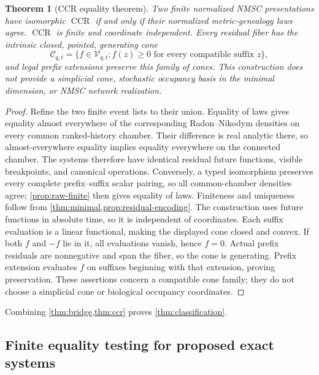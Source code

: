 \documentclass[11pt]{article}
\newtheorem{theorem}{Theorem}[section]
\newcommand{\CCR}{\operatorname{CCR}}
\newcommand{\cV}{\mathcal V}
\newcommand{\cC}{\mathcal C}
\begin{document}
\begin{theorem}[CCR equality theorem]
\label{thm:ccr}
Two finite normalized NMSC presentations have isomorphic $\CCR$ if and only if their normalized metric-genealogy laws agree.  $\CCR$ is finite and coordinate independent.  Every residual fiber has the intrinsic closed, pointed, generating cone
\[
\cC_{q,t}=\{f\in\cV_{q,t}: f(z)\ge0\text{ for every compatible suffix }z\},
\]
and legal prefix extensions preserve this family of cones.  This construction does not provide a simplicial cone, stochastic occupancy basis in the minimal dimension, or NMSC network realization.
\end{theorem}

\begin{proof}
Refine the two finite event lists to their union.  Equality of laws gives equality almost everywhere of the corresponding Radon--Nikodym densities on every common ranked-history chamber.  Their difference is real analytic there, so almost-everywhere equality implies equality everywhere on the connected chamber.  The systems therefore have identical residual future functions, visible breakpoints, and canonical operations.  Conversely, a typed isomorphism preserves every complete prefix--suffix scalar pairing, so all common-chamber densities agree; \cref{prop:raw-finite} then gives equality of laws.  Finiteness and uniqueness follow from \cref{thm:minimal,prop:residual-encoding}.  The construction uses future functions in absolute time, so it is independent of coordinates.  Each suffix evaluation is a linear functional, making the displayed cone closed and convex.  If both $f$ and $-f$ lie in it, all evaluations vanish, hence $f=0$.  Actual prefix residuals are nonnegative and span the fiber, so the cone is generating.  Prefix extension evaluates $f$ on suffixes beginning with that extension, proving preservation.  These assertions concern a compatible cone family; they do not choose a simplicial cone or biological occupancy coordinates.
\end{proof}

Combining \cref{thm:bridge,thm:ccr} proves \cref{thm:classification}.

\subsection{Finite equality testing for proposed exact systems}
\end{document}

